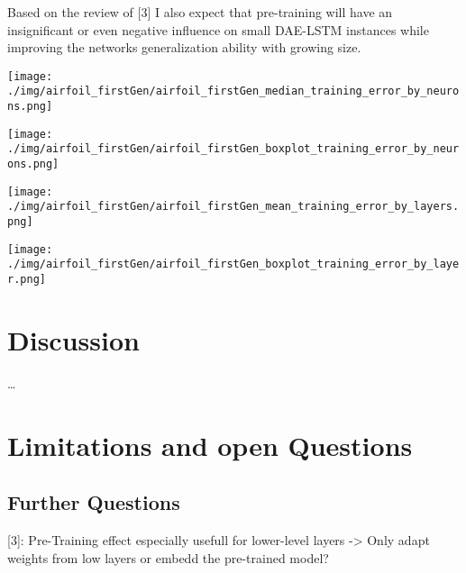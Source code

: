 \documentclass[
  11pt,
]{article}
\let\origfigure\figure
\let\endorigfigure\endfigure
\renewenvironment{figure}[1][2] {
    \expandafter\origfigure\expandafter[H]
} {
    \endorigfigure
}
\begin{document}
Based on the review of {[}3{]} I also expect that pre-training will have
an insignificant or even negative influence on small DAE-LSTM instances
while improving the networks generalization ability with growing size.

\begin{figure}
\centering
\texttt{[image: ./img/airfoil\_firstGen/airfoil\_firstGen\_median\_training\_error\_by\_neurons.png]}
\caption{Airfoil - First Generation Median Training Error for variable
number of hidden Neurons}
\end{figure}

\begin{figure}
\centering
\texttt{[image: ./img/airfoil\_firstGen/airfoil\_firstGen\_boxplot\_training\_error\_by\_neurons.png]}
\caption{Airfoil - First Generation final Training Error for variable
number of hidden Neurons}
\end{figure}

\begin{figure}
\centering
\texttt{[image: ./img/airfoil\_firstGen/airfoil\_firstGen\_mean\_training\_error\_by\_layers.png]}
\caption{Airfoil - First Generation Median Training Error for variable
number of hidden Layers}
\end{figure}

\begin{figure}
\centering
\texttt{[image: ./img/airfoil\_firstGen/airfoil\_firstGen\_boxplot\_training\_error\_by\_layer.png]}
\caption{Airfoil - First Generation final Training Error for variable
number of hidden Layers}
\end{figure}

\hypertarget{discussion}{%
\section{Discussion}\label{discussion}}

\ldots{}

\hypertarget{limitations-and-open-questions}{%
\section{Limitations and open
Questions}\label{limitations-and-open-questions}}

\hypertarget{further-questions}{%
\subsection{Further Questions}\label{further-questions}}

{[}3{]}: Pre-Training effect especially usefull for lower-level layers
-\textgreater{} Only adapt weights from low layers or embedd the
pre-trained model?
\end{document}
